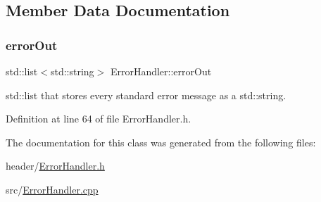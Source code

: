 \subsection{Member Data Documentation}
\mbox{\label{classErrorHandler_aeb3bff116fcb83a58defbef8e8111f0e}} 
\subsubsection{\texorpdfstring{errorOut}{errorOut}}
{\footnotesize\ttfamily std\+::list$<$std\+::string$>$ Error\+Handler\+::error\+Out\hspace{0.3cm}{\ttfamily [private]}}

std\+::list that stores every standard error message as a std\+::string. 

Definition at line 64 of file Error\+Handler.\+h.



The documentation for this class was generated from the following files\+:\begin{DoxyCompactItemize}
\item 
header/\mbox{\hyperlink{ErrorHandler_8h}{Error\+Handler.\+h}}\item 
src/\mbox{\hyperlink{ErrorHandler_8cpp}{Error\+Handler.\+cpp}}\end{DoxyCompactItemize}
